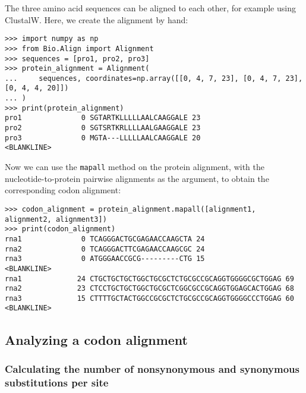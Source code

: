 The three amino acid sequences can be aligned to each other, for example using ClustalW. Here, we create the alignment by hand:
\begin{verbatim}
>>> import numpy as np
>>> from Bio.Align import Alignment
>>> sequences = [pro1, pro2, pro3]
>>> protein_alignment = Alignment(
...     sequences, coordinates=np.array([[0, 4, 7, 23], [0, 4, 7, 23], [0, 4, 4, 20]])
... )
>>> print(protein_alignment)
pro1              0 SGTARTKLLLLLAALCAAGGALE 23
pro2              0 SGTSRTKRLLLLAALGAAGGALE 23
pro3              0 MGTA---LLLLLAALCAAGGALE 20
<BLANKLINE>
\end{verbatim}
Now we can use the \verb+mapall+ method on the protein alignment, with the nucleotide-to-protein pairwise alignments as the argument, to obtain the corresponding codon alignment:
\begin{verbatim}
>>> codon_alignment = protein_alignment.mapall([alignment1, alignment2, alignment3])
>>> print(codon_alignment)
rna1              0 TCAGGGACTGCGAGAACCAAGCTA 24
rna2              0 TCAGGGACTTCGAGAACCAAGCGC 24
rna3              0 ATGGGAACCGCG---------CTG 15
<BLANKLINE>
rna1             24 CTGCTGCTGCTGGCTGCGCTCTGCGCCGCAGGTGGGGCGCTGGAG 69
rna2             23 CTCCTGCTGCTGGCTGCGCTCGGCGCCGCAGGTGGAGCACTGGAG 68
rna3             15 CTTTTGCTACTGGCCGCGCTCTGCGCCGCAGGTGGGGCCCTGGAG 60
<BLANKLINE>
\end{verbatim}

\subsection{Analyzing a codon alignment}

\subsubsection*{Calculating the number of nonsynonymous and synonymous substitutions per site}


